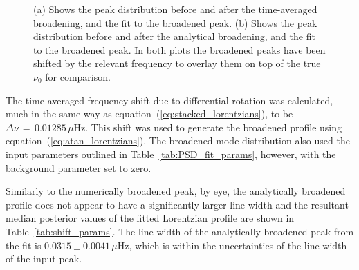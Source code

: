 \begin{figure}[ht!]
	\centering
	\qquad
	\caption{(a) Shows the peak distribution before and after the time-averaged broadening, and the fit to the broadened peak. (b) Shows the peak distribution before and after the analytical broadening, and the fit to the broadened peak. In both plots the broadened peaks have been shifted by the relevant frequency to overlay them on top of the true $\nu_0$ for comparison.} \label{fig:shifted_peaks}
\end{figure}


The time-averaged frequency shift due to differential rotation was calculated, much in the same way as equation~(\ref{eq:stacked_lorentzians}), to be $\Delta\nu \, = \,0.01285 \, \mu\mathrm{Hz}$. This shift was used to generate the broadened profile using equation~(\ref{eq:atan_lorentzians}). The broadened mode distribution also used the input parameters outlined in Table~\ref{tab:PSD_fit_params}, however, with the background parameter set to zero.

Similarly to the numerically broadened peak, by eye, the analytically broadened profile does not appear to have a significantly larger line-width and the resultant median posterior values of the fitted Lorentzian profile are shown in Table~\ref{tab:shift_params}. The line-width of the analytically broadened peak from the fit is $0.0315 \pm 0.0041 \, \mu\mathrm{Hz} $, which is within the uncertainties of the line-width of the input peak.

